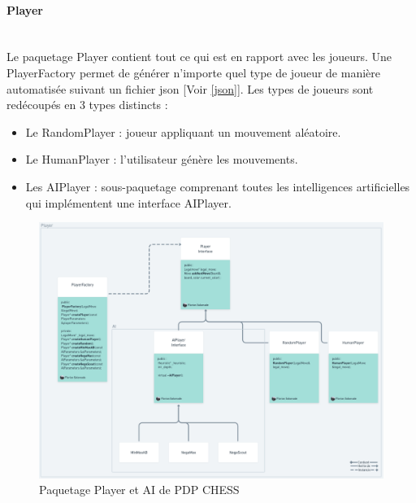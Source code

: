\huge\documentclass{article}
\begin{document}
\paragraph{Player}
~~\\
\newline
Le paquetage Player contient tout ce qui est en rapport avec les joueurs.
Une PlayerFactory permet de générer n'importe quel type de joueur de manière automatisée suivant un fichier json [Voir \ref{json}].
Les types de joueurs sont redécoupés en 3 types distincts : 
\begin{itemize}
    \item Le RandomPlayer : joueur appliquant un mouvement aléatoire.
    \item Le HumanPlayer : l'utilisateur génère les mouvements.
    \item Les AIPlayer : sous-paquetage comprenant toutes les intelligences artificielles qui implémentent une interface AIPlayer.
    \newline
\end{itemize}

\begin{figure}[!h]
    \centering
    \includegraphics[scale = 0.40]{img/Package/Player.png}
    \caption{Paquetage Player et AI de PDP CHESS}
    \label{pck:player}
\end{figure}

\newpage
\end{document}
